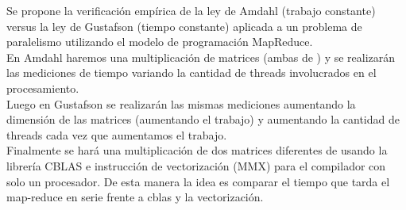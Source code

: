 Se propone la verificación empírica de la ley de Amdahl  (trabajo constante)
versus la ley de  Gustafson (tiempo constante) aplicada a un problema de
paralelismo utilizando el modelo de programación MapReduce.\\
En Amdahl haremos una multiplicación de matrices (ambas de ) y se
realizarán las mediciones de tiempo variando la cantidad de threads involucrados
en el procesamiento.\\
Luego en Gustafson se realizarán las mismas mediciones aumentando la dimensión
de las matrices (aumentando el trabajo) y aumentando la cantidad de threads cada
vez que aumentamos el trabajo.\\
Finalmente se hará una multiplicación de dos matrices diferentes de 
usando la librería CBLAS e instrucción de vectorización (MMX) para el compilador
con solo un procesador. De esta manera la idea es comparar el tiempo que tarda
el map-reduce en serie frente a cblas y la vectorización.
